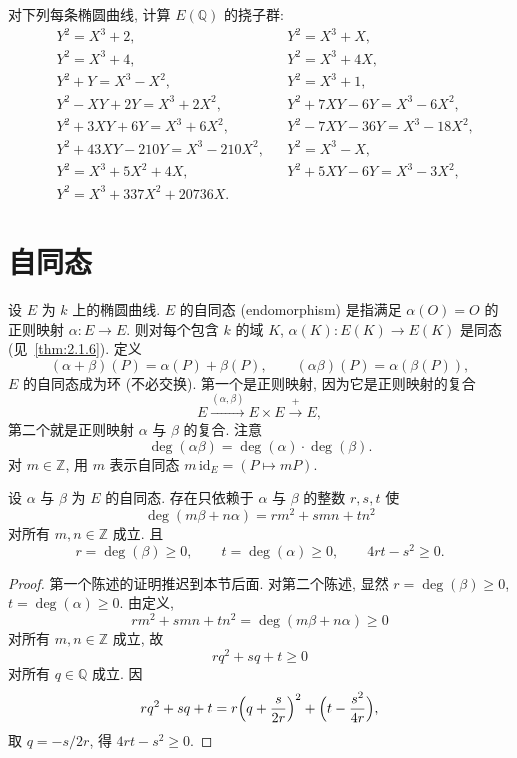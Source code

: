 \begin{exercise} \label{thm:2.5.13} 
对下列每条椭圆曲线, 计算 $E(\mathbb{Q})$ 的挠子群:
\begin{align*}
&Y^2 = X^3 + 2, && Y^2 = X^3 + X,\\
&Y^2 = X^3 + 4, && Y^2 = X^3 + 4X,\\
&Y^2 + Y = X^3 - X^2, && Y^2 = X^3 + 1,\\
&Y^2 - XY + 2Y = X^3 + 2X^2, && Y^2 + 7XY - 6Y = X^3 - 6X^2,\\
&Y^2 + 3XY + 6Y = X^3 + 6X^2, && Y^2 - 7XY - 36Y = X^3 - 18X^2,\\
&Y^2 + 43XY - 210Y = X^3 - 210X^2, && Y^2 = X^3 - X,\\
&Y^2 = X^3 + 5X^2 + 4X, && Y^2 + 5XY - 6Y = X^3 - 3X^2,\\
&Y^2 = X^3 + 337X^2 + 20736X.
\end{align*}
\end{exercise}

\section{自同态}\label{sec:2.6}

设 $E$ 为 $k$ 上的椭圆曲线. $E$ 的自同态 (endomorphism) 是指满足 $\alpha(O) = O$ 的正则映射 $\alpha\colon E\to E$. 则对每个包含 $k$ 的域 $K$, $\alpha(K)\colon E(K)\to E(K)$ 是同态 (见~\ref{thm:2.1.6}). 定义
\[
(\alpha+\beta)(P) = \alpha(P) + \beta(P), \qquad
(\alpha\beta)(P) = \alpha(\beta(P)),
\]
$E$ 的自同态成为环 (不必交换). 第一个是正则映射, 因为它是正则映射的复合
\[
E\xrightarrow{(\alpha,\beta)}E\times E\xrightarrow{+}E,
\]
第二个就是正则映射 $\alpha$ 与 $\beta$ 的复合. 注意
\begin{equation} \label{eq:18}
\deg(\alpha\beta) = \deg(\alpha)\cdot\deg(\beta).
\tag{18}
\end{equation}
对 $m\in\mathbb{Z}$, 用 $m$ 表示自同态 $m\,\mathrm{id}_E = (P\mapsto mP)$.

\begin{theorem} \label{thm:2.6.1} 
设 $\alpha$ 与 $\beta$ 为 $E$ 的自同态. 存在只依赖于 $\alpha$ 与 $\beta$ 的整数 $r, s, t$ 使
\[
\deg(m\beta + n\alpha) = rm^2 + smn + tn^2
\]
对所有 $m, n\in\mathbb{Z}$ 成立. 且
\[
r = \deg(\beta)\ge 0, \qquad t = \deg(\alpha)\ge 0, \qquad 4rt - s^2\ge 0.
\]
\end{theorem}

\begin{proof}
第一个陈述的证明推迟到本节后面. 对第二个陈述, 显然 $r = \deg(\beta)\ge 0$, $t = \deg(\alpha)\ge 0$. 由定义,
\[
rm^2 + smn + tn^2 = \deg(m\beta + n\alpha)\ge 0
\]
对所有 $m, n\in\mathbb{Z}$ 成立, 故
\[
rq^2 + sq + t\ge 0
\]
对所有 $q\in\mathbb{Q}$ 成立. 因
\[
rq^2 + sq + t = r\Bigl(q + \frac{s}{2r}\Bigr)^2 + \Bigl(t - \frac{s^2}{4r}\Bigr),
\]
取 $q = -s/2r$, 得 $4rt - s^2\ge 0$.
\end{proof}

